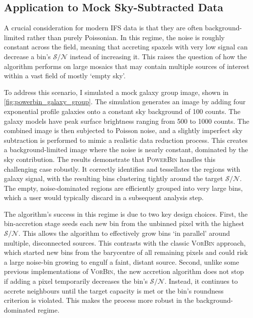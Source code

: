 \documentclass[fleqn,usenatbib]{mnras}
\newcommand{\sn}{\mathcal{S/N}}
\begin{document}
\subsection{Application to Mock Sky-Subtracted Data}
\label{sec:background_limited}

A crucial consideration for modern IFS data is that they are often background-limited rather than purely Poissonian. In this regime, the noise is roughly constant across the field, meaning that accreting spaxels with very low signal can decrease a bin's $\sn$ instead of increasing it. This raises the question of how the algorithm performs on large mosaics that may contain multiple sources of interest within a vast field of mostly `empty sky'.

To address this scenario, I simulated a mock galaxy group image, shown in \autoref{fig:powerbin_galaxy_group}. The simulation generates an image by adding four exponential profile galaxies onto a constant sky background of 100 counts. The galaxy models have peak surface brightness ranging from 500 to 1000 counts. The combined image is then subjected to Poisson noise, and a slightly imperfect sky subtraction is performed to mimic a realistic data reduction process. This creates a background-limited image where the noise is nearly constant, dominated by the sky contribution. The results demonstrate that \textsc{PowerBin} handles this challenging case robustly. It correctly identifies and tessellates the regions with galaxy signal, with the resulting bins clustering tightly around the target $\sn$. The empty, noise-dominated regions are efficiently grouped into very large bins, which a user would typically discard in a subsequent analysis step.

The algorithm's success in this regime is due to two key design choices. First, the bin-accretion stage seeds each new bin from the unbinned pixel with the highest $\sn$. This allows the algorithm to effectively grow bins `in parallel' around multiple, disconnected sources. This contrasts with the classic \textsc{VorBin} approach, which started new bins from the barycentre of all remaining pixels and could risk a large noise-bin growing to engulf a faint, distant source. Second, unlike some previous implementations of \textsc{VorBin}, the new accretion algorithm does not stop if adding a pixel temporarily decreases the bin's $\sn$. Instead, it continues to accrete neighbours until the target capacity is met or the bin's roundness criterion is violated. This makes the process more robust in the background-dominated regime.
 
\end{document}
